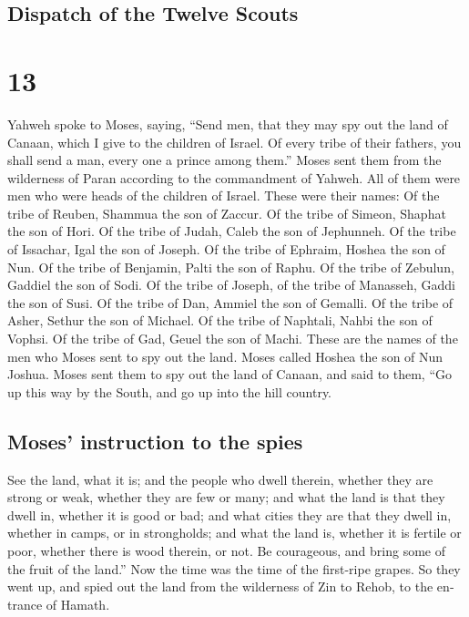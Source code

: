 \begin{paracol}{2}
\switchcolumn
\begin{otherlanguage}{english}

\hypertarget{dispatch-of-the-twelve-scouts}{%
\subsection{Dispatch of the Twelve
Scouts}\label{dispatch-of-the-twelve-scouts}}

\hypertarget{section-25}{%
\section{13}\label{section-25}}

 Yahweh spoke to Moses, saying,  ``Send men,
that they may spy out the land of Canaan, which I give to the children
of Israel. Of every tribe of their fathers, you shall send a man, every
one a prince among them.''  Moses sent them from the
wilderness of Paran according to the commandment of Yahweh. All of them
were men who were heads of the children of Israel.  These
were their names: Of the tribe of Reuben, Shammua the son of Zaccur.
 Of the tribe of Simeon, Shaphat the son of Hori.
 Of the tribe of Judah, Caleb the son of Jephunneh.
 Of the tribe of Issachar, Igal the son of Joseph.
 Of the tribe of Ephraim, Hoshea the son of Nun.
 Of the tribe of Benjamin, Palti the son of Raphu.
 Of the tribe of Zebulun, Gaddiel the son of Sodi.
 Of the tribe of Joseph, of the tribe of Manasseh, Gaddi
the son of Susi.  Of the tribe of Dan, Ammiel the son of
Gemalli.  Of the tribe of Asher, Sethur the son of
Michael.  Of the tribe of Naphtali, Nahbi the son of
Vophsi.  Of the tribe of Gad, Geuel the son of Machi.
 These are the names of the men who Moses sent to spy out
the land. Moses called Hoshea the son of Nun Joshua. 
Moses sent them to spy out the land of Canaan, and said to them, ``Go up
this way by the South, and go up into the hill country.

\hypertarget{moses-instruction-to-the-spies}{%
\subsection{Moses' instruction to the
spies}\label{moses-instruction-to-the-spies}}

 See the land, what it is; and the people who dwell
therein, whether they are strong or weak, whether they are few or many;
 and what the land is that they dwell in, whether it is
good or bad; and what cities they are that they dwell in, whether in
camps, or in strongholds;  and what the land is, whether
it is fertile or poor, whether there is wood therein, or not. Be
courageous, and bring some of the fruit of the land.'' Now the time was
the time of the first-ripe grapes.  So they went up, and
spied out the land from the wilderness of Zin to Rehob, to the entrance
of Hamath.


\end{otherlanguage}
\end{paracol}
